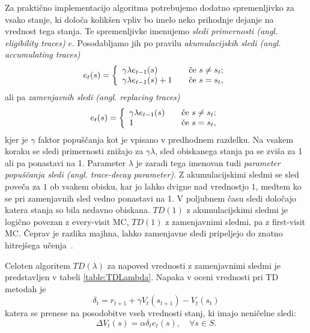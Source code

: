 \documentclass[a4paper, oneside, 12pt]{report}
\begin{document}

Za praktično implementacijo algoritma potrebujemo dodatno spremenljivko za vsako stanje, ki določa kolikšen vpliv bo imelo neko prihodnje dejanje na vrednost tega stanja. Te spremenljivke imenujemo {\em sledi primernosti (angl. eligibility traces)} $e$. Posodabljamo jih po pravilu {\em akumulacijskih sledi (angl. accumulating traces)}
\begin{equation}
e_t(s) = \left\{
\begin{array}{l l}
\gamma \lambda e_{t-1}(s) & \quad \textrm{če $s \ne s_t$};\\
\gamma \lambda e_{t-1}(s) + 1 & \quad \textrm{če $s = s_t$},
\end{array}
\right.
\end{equation}
ali pa {\em zamenjavnih sledi (angl. replacing traces)}
\begin{equation}
e_t(s) = \left\{
\begin{array}{l l}
\gamma \lambda e_{t-1}(s) & \quad \textrm{če $s \ne s_t$};\\
1 & \quad \textrm{če $s = s_t$},
\end{array}
\right.
\end{equation}
kjer je $\gamma$ faktor popuščanja kot je vpisano v predhodnem razdelku. Na vsakem koraku se sledi primernosti znižajo za $\gamma \lambda$, sled obiskanega stanja pa se zviša za 1 ali pa ponastavi na 1. Parameter $\lambda$ je zaradi tega imenovan tudi {\em parameter popuščanja sledi (angl. trace-decay parameter)}. Z akumulacijskimi sledmi se sled poveča za $1$ ob vsakem obisku, kar jo lahko dvigne nad vrednostjo $1$, medtem ko se pri zamenjavnih sled vedno ponastavi na 1. V poljubnem času sledi določajo katera stanja so bila nedavno obiskana. $TD(1)$ z akumulacijskimi sledmi je logično povezan z every-visit MC, $TD(1)$ z zamenjavnimi sledmi, pa z first-visit MC. Čeprav je razlika majhna, lahko zamenjavne sledi pripeljejo do znatno hitrejšega učenja~\cite{ReinforcementLearningAnIntroduction}.

Celoten algoritem $TD(\lambda)$ za napoved vrednosti z zamenjavnimi sledmi je predstavljen v tabeli \ref{table:TDLambda}. Napaka v oceni vrednosti pri TD metodah je
\begin{equation}
\delta_t = r_{t+1} + \gamma V_t(s_{t+1}) - V_t(s_t)
\end{equation}
katera se prenese na posodobitve vseh vrednosti stanj, ki imajo neničelne sledi:
\begin{equation}
\Delta V_t(s) = \alpha \delta_t e_t(s), \quad \forall s \in S.
\end{equation}
\end{document}
